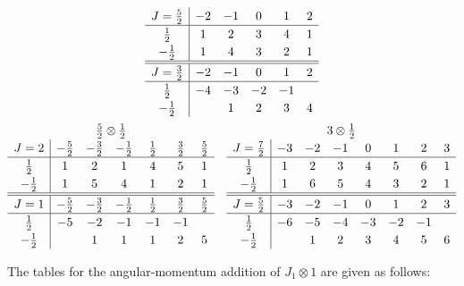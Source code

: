 \documentclass[amsmath,amssymb,prc,aps]{revtex4-2}
\begin{document}
\begin{gather}
\begin{array}[t]{c|ccccc}
  J=\tfrac52 & -2 & -1 &  0 &  1 & 2 \\ \hline
   \tfrac12  &  1 &  2 &  3 &  4 & 1 \\
  -\tfrac12  &  1 &  4 &  3 &  2 & 1
  \\\hline\hline
  J=\tfrac32 & -2 & -1 &  0 &  1 & 2 \\ \hline
   \tfrac12  & -4 & -3 & -2 & -1 &   \\
  -\tfrac12  &    &  1 &  2 &  3 & 4
  \end{array} \\
  \renewcommand{\arraystretch}{1.2}
  \begin{array}[t]{c|cccccc}
  \multicolumn{7}{c}{\tfrac52\otimes\tfrac12} \\
  J=2        & -\tfrac52 & -\tfrac32 & -\tfrac12 & \tfrac12 & \tfrac32 & \tfrac52 \\ \hline
   \tfrac12  &  1        &  2        &  1        &  4       &  5       &  1       \\
  -\tfrac12  &  1        &  5        &  4        &  1       &  2       &  1
  \\\hline\hline
  J=1        & -\tfrac52 & -\tfrac32 & -\tfrac12 & \tfrac12 & \tfrac32 & \tfrac52 \\ \hline
   \tfrac12  & -5        & -2        & -1        & -1       & -1       &          \\
  -\tfrac12  &           &  1        &  1        &  1       &  2       &  5
  \end{array}
  \quad
  \begin{array}[t]{c|ccccccc}
  \multicolumn{8}{c}{3\otimes\tfrac12} \\
  J=\tfrac72 & -3 & -2 & -1 &  0 &  1 &  2 & 3 \\ \hline
   \tfrac12  &  1 &  2 &  3 &  4 &  5 &  6 & 1 \\
  -\tfrac12  &  1 &  6 &  5 &  4 &  3 &  2 & 1
  \\\hline\hline
  J=\tfrac52 & -3 & -2 & -1 &  0 &  1 &  2 & 3 \\ \hline
   \tfrac12  & -6 & -5 & -4 & -3 & -2 & -1 &   \\
  -\tfrac12  &    &  1 &  2 &  3 &  4 &  5 & 6
  \end{array}
\end{gather}

The tables for the angular-momentum addition of $J_1 \otimes 1$ are given as follows:
\end{document}
